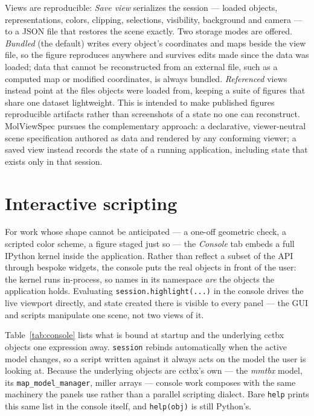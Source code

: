 \documentclass[11pt]{article}
\begin{document}
Views are reproducible: \emph{Save view} serializes the session --- loaded
objects, representations, colors, clipping, selections, visibility,
background and camera --- to a JSON file that restores the scene exactly.
Two storage modes are offered. \emph{Bundled} (the default) writes every
object's coordinates and maps beside the view file, so the figure reproduces
anywhere and survives edits made since the data was loaded; data that cannot
be reconstructed from an external file, such as a computed map or modified
coordinates, is always bundled. \emph{Referenced} views instead point at the
files objects were loaded from, keeping a suite of figures that share one
dataset lightweight. This is intended to make published figures
reproducible artifacts rather than screenshots of a state no one can
reconstruct. MolViewSpec \citep{mvs2025, mvstoolkit2024} pursues the
complementary approach: a declarative, viewer-neutral scene specification
authored as data and rendered by any conforming viewer; a saved view
instead records the state of a running application, including state that
exists only in that session.

\section{Interactive scripting}
\label{sec:scripting}

For work whose shape cannot be anticipated --- a one-off geometric check, a
scripted color scheme, a figure staged just so --- the \emph{Console} tab
embeds a full IPython kernel inside the application. Rather than reflect a
subset of the API through bespoke widgets, the console puts the real objects
in front of the user: the kernel runs in-process, so names in its namespace
\emph{are} the objects the application holds. Evaluating
\texttt{session.highlight(...)} in the console drives the live viewport
directly, and state created there is visible to every panel --- the GUI and
scripts manipulate one scene, not two views of it.

Table~\ref{tab:console} lists what is bound at startup and the underlying
cctbx objects one expression away. \texttt{session} rebinds automatically
when the active model changes, so a script written against it always acts on
the model the user is looking at. Because the underlying objects are cctbx's
own --- the \emph{mmtbx} model, its \texttt{map\_model\_manager}, miller
arrays --- console work composes with the same machinery the panels use
rather than a parallel scripting dialect. Bare \texttt{help} prints this
same list in the console itself, and \texttt{help(obj)} is still Python's.
\end{document}
